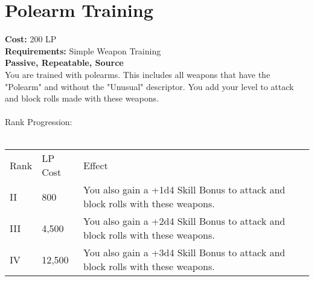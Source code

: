 \section{Polearm Training}\label{perk:polearmTraining}
\textbf{Cost:} 200 LP\\
\textbf{Requirements:} Simple Weapon Training\\
\textbf{Passive, Repeatable, Source}\\
You are trained with polearms.
This includes all weapons that have the "Polearm" and without the "Unusual" descriptor.
You add your level to attack and block rolls made with these weapons.\\
\\
Rank Progression:\\
\\
\begin{longtable}{l | l | p{9cm}}
	Rank & LP Cost & Effect\\
	II & 800 & You also gain a +1d4 Skill Bonus to attack and block rolls with these weapons.\\
	III & 4,500 & You also gain a +2d4 Skill Bonus to attack and block rolls with these weapons.\\
	IV & 12,500 & You also gain a +3d4 Skill Bonus to attack and block rolls with these weapons.\\
\end{longtable}